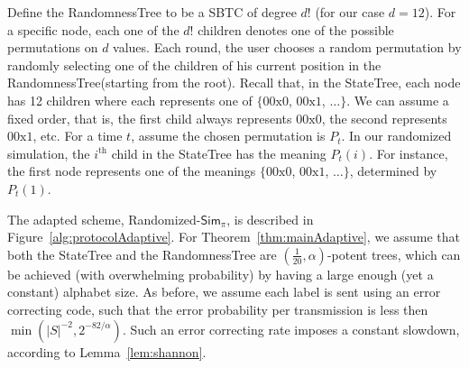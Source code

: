 \documentclass[ letterpaper, 11pt]{article}
\newcommand{\statetree}{{\textsf{StateTree}}\xspace}
\newcommand{\randomtree}{{\textsf{RandomnessTree}}\xspace}
\newcommand{\potent}{potent\xspace}
\newcommand{\Sim}{{\mathsf{Sim}_\pi}}
\newcommand{\KTC}{\textsf{SBTC}\xspace}
\begin{document}
Define the \randomtree to be a \KTC of degree $d!$ (for our case $d=12$).
For a specific node, each one of  the $d!$ children
denotes one of the possible permutations on $d$ values.
Each round, the user chooses a random permutation by randomly selecting
one of the children of his current position in the \randomtree (starting from the root).
Recall that, in the \statetree, each node has 12 children where each represents one of
$\{00\text{x}0$, $00\text{x}1$, $\ldots\}$. We can assume a fixed order, that is, the first child always
represents $00\text{x}0$, the second represents $00\text{x}1$, etc.
For a time $t$, assume the chosen permutation is $P_t$.
In our randomized simulation, the $i^{\text{th}}$ child in the
\statetree has the meaning  $P_t(i)$. For instance, the first node represents
one of the meanings $\{00\text{x}0$, $00\text{x}1$, $\ldots\}$, determined by $P_t(1)$.

The adapted scheme, Randomized-$\Sim$, is described in Figure~\ref{alg:protocolAdaptive}.
For Theorem~\ref{thm:mainAdaptive}, we assume that
both the \statetree and the \randomtree are $(\frac1{20},\alpha)$-\potent trees,
which can be achieved (with overwhelming probability)
by having a large enough (yet a constant) alphabet size.
As before, we assume each label is sent using an error correcting code, such that
the error probability per transmission is less then $\min (|S|^{-2}, 2^{-82/\alpha})$.
Such an error correcting rate imposes
a constant slowdown, according to Lemma~\ref{lem:shannon}.
\end{document}
